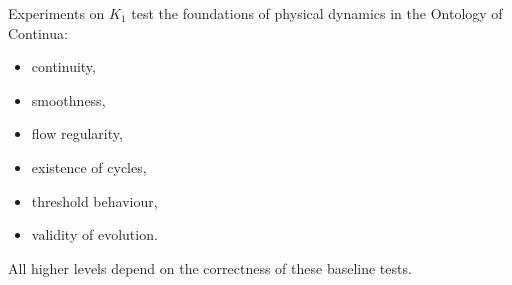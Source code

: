 Experiments on $K_1$ test the foundations of physical dynamics in the
Ontology of Continua:

\begin{itemize}
    \item continuity,
    \item smoothness,
    \item flow regularity,
    \item existence of cycles,
    \item threshold behaviour,
    \item validity of evolution.
\end{itemize}

All higher levels depend on the correctness of these baseline tests.
